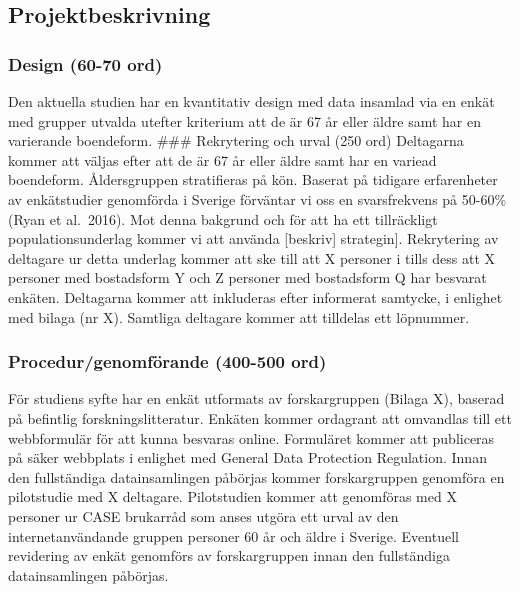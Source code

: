 \documentclass[]{tufte-handout}
\begin{document}
\hypertarget{projektbeskrivning}{%
\subsection{Projektbeskrivning}\label{projektbeskrivning}}

\hypertarget{design-60-70-ord}{%
\subsubsection{Design (60-70 ord)}\label{design-60-70-ord}}

Den aktuella studien har en kvantitativ design med data insamlad via en
enkät med grupper utvalda utefter kriterium att de är 67 år eller äldre
samt har en varierande boendeform. \#\#\# Rekrytering och urval (250
ord) Deltagarna kommer att väljas efter att de är 67 år eller äldre samt
har en variead boendeform. Åldersgruppen stratifieras på kön. Baserat på
tidigare erfarenheter av enkätstudier genomförda i Sverige förväntar vi
oss en svarsfrekvens på 50-60\% (Ryan et al.~2016). Mot denna bakgrund
och för att ha ett tillräckligt populationsunderlag kommer vi att
använda {[}beskriv{]} strategin{]}. Rekrytering av deltagare ur detta
underlag kommer att ske till att X personer i tills dess att X personer
med bostadsform Y och Z personer med bostadsform Q har besvarat enkäten.
Deltagarna kommer att inkluderas efter informerat samtycke, i enlighet
med bilaga (nr X). Samtliga deltagare kommer att tilldelas ett
löpnummer.

\hypertarget{procedurgenomfuxf6rande-400-500-ord}{%
\subsubsection{Procedur/genomförande (400-500
ord)}\label{procedurgenomfuxf6rande-400-500-ord}}

För studiens syfte har en enkät utformats av forskargruppen (Bilaga X),
baserad på befintlig forskningslitteratur. Enkäten kommer ordagrant att
omvandlas till ett webbformulär för att kunna besvaras online.
Formuläret kommer att publiceras på säker webbplats i enlighet med
General Data Protection Regulation. Innan den fullständiga
datainsamlingen påbörjas kommer forskargruppen genomföra en pilotstudie
med X deltagare. Pilotstudien kommer att genomföras med X personer ur
CASE brukarråd som anses utgöra ett urval av den internetanvändande
gruppen personer 60 år och äldre i Sverige. Eventuell revidering av
enkät genomförs av forskargruppen innan den fullständiga datainsamlingen
påbörjas.
\end{document}
